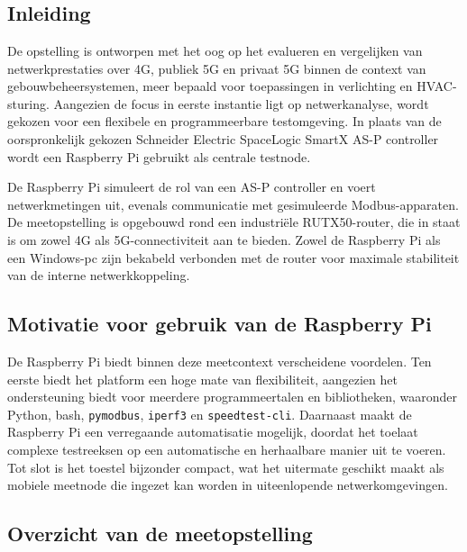 \chapter{}%
\label{ch:basisopstelling}

\section{Inleiding}

De opstelling is ontworpen met het oog op het evalueren en vergelijken van netwerkprestaties over 4G, publiek 5G en privaat 5G binnen de context van gebouwbeheersystemen, meer bepaald voor toepassingen in verlichting en HVAC-sturing. Aangezien de focus in eerste instantie ligt op netwerkanalyse, wordt gekozen voor een flexibele en programmeerbare testomgeving. In plaats van de oorspronkelijk gekozen Schneider Electric SpaceLogic SmartX AS-P controller wordt een Raspberry Pi gebruikt als centrale testnode.

De Raspberry Pi simuleert de rol van een AS-P controller en voert netwerkmetingen uit, evenals communicatie met gesimuleerde Modbus-apparaten. De meetopstelling is opgebouwd rond een industriële RUTX50-router, die in staat is om zowel 4G als 5G-connectiviteit aan te bieden. Zowel de Raspberry Pi als een Windows-pc zijn bekabeld verbonden met de router voor maximale stabiliteit van de interne netwerkkoppeling.

\section{Motivatie voor gebruik van de Raspberry Pi}

De Raspberry Pi biedt binnen deze meetcontext verscheidene voordelen. Ten eerste biedt het platform een hoge mate van flexibiliteit, aangezien het ondersteuning biedt voor meerdere programmeertalen en bibliotheken, waaronder Python, bash, \texttt{pymodbus}, \texttt{iperf3} en \texttt{speedtest-cli}. Daarnaast maakt de Raspberry Pi een verregaande automatisatie mogelijk, doordat het toelaat complexe testreeksen op een automatische en herhaalbare manier uit te voeren. Tot slot is het toestel bijzonder compact, wat het uitermate geschikt maakt als mobiele meetnode die ingezet kan worden in uiteenlopende netwerkomgevingen.


\section{Overzicht van de meetopstelling}


